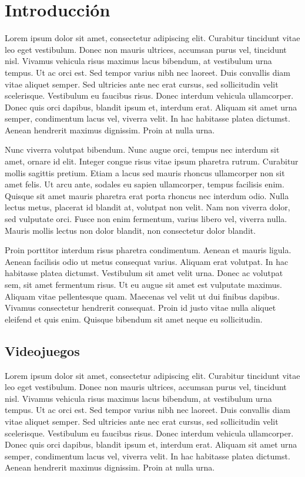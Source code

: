 \chapter*{Introducción}
\label{intro:intro}

Lorem ipsum dolor sit amet, consectetur adipiscing elit. Curabitur tincidunt vitae leo eget vestibulum. Donec non mauris ultrices, accumsan purus vel, tincidunt nisl. Vivamus vehicula risus maximus lacus bibendum, at vestibulum urna tempus. Ut ac orci est. Sed tempor varius nibh nec laoreet. Duis convallis diam vitae aliquet semper. Sed ultricies ante nec erat cursus, sed sollicitudin velit scelerisque. Vestibulum eu faucibus risus. Donec interdum vehicula ullamcorper. Donec quis orci dapibus, blandit ipsum et, interdum erat. Aliquam sit amet urna semper, condimentum lacus vel, viverra velit. In hac habitasse platea dictumst. Aenean hendrerit maximus dignissim. Proin at nulla urna.

Nunc viverra volutpat bibendum. Nunc augue orci, tempus nec interdum sit amet, ornare id elit. Integer congue risus vitae ipsum pharetra rutrum. Curabitur mollis sagittis pretium. Etiam a lacus sed mauris rhoncus ullamcorper non sit amet felis. Ut arcu ante, sodales eu sapien ullamcorper, tempus facilisis enim. Quisque sit amet mauris pharetra erat porta rhoncus nec interdum odio. Nulla lectus metus, placerat id blandit at, volutpat non velit. Nam non viverra dolor, sed vulputate orci. Fusce non enim fermentum, varius libero vel, viverra nulla. Mauris mollis lectus non dolor blandit, non consectetur dolor blandit.

Proin porttitor interdum risus pharetra condimentum. Aenean et mauris ligula. Aenean facilisis odio ut metus consequat varius. Aliquam erat volutpat. In hac habitasse platea dictumst. Vestibulum sit amet velit urna. Donec ac volutpat sem, sit amet fermentum risus. Ut eu augue sit amet est vulputate maximus. Aliquam vitae pellentesque quam. Maecenas vel velit ut dui finibus dapibus. Vivamus consectetur hendrerit consequat. Proin id justo vitae nulla aliquet eleifend et quis enim. Quisque bibendum sit amet neque eu sollicitudin.



\section*{Videojuegos}

Lorem ipsum dolor sit amet, consectetur adipiscing elit. Curabitur tincidunt vitae leo eget vestibulum. Donec non mauris ultrices, accumsan purus vel, tincidunt nisl. Vivamus vehicula risus maximus lacus bibendum, at vestibulum urna tempus. Ut ac orci est. Sed tempor varius nibh nec laoreet. Duis convallis diam vitae aliquet semper. Sed ultricies ante nec erat cursus, sed sollicitudin velit scelerisque. Vestibulum eu faucibus risus. Donec interdum vehicula ullamcorper. Donec quis orci dapibus, blandit ipsum et, interdum erat. Aliquam sit amet urna semper, condimentum lacus vel, viverra velit. In hac habitasse platea dictumst. Aenean hendrerit maximus dignissim. Proin at nulla urna.

